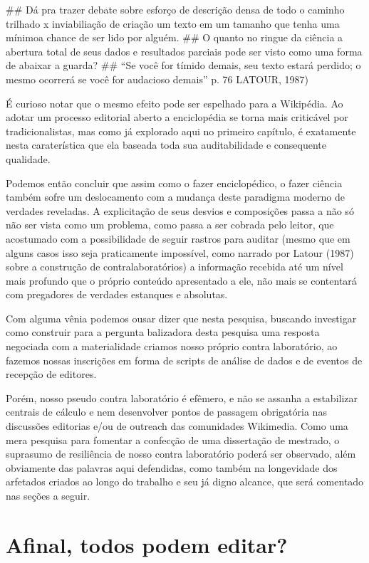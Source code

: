 ## Dá pra trazer debate sobre esforço de descrição densa de todo o caminho trilhado x inviabiliação de criação um texto em um tamanho que tenha uma mínimoa chance de ser lido por alguém. 
## O quanto no ringue da ciência a abertura total de seus dados e resultados parciais pode ser visto como uma forma de abaixar a guarda?
## ``Se você for tímido demais, seu texto estará perdido; o mesmo ocorrerá se você for audacioso demais'' p. 76 LATOUR, 1987)

É curioso notar que o mesmo efeito pode ser espelhado para a Wikipédia. Ao adotar um processo editorial aberto a enciclopédia se torna mais criticável por tradicionalistas, mas como já explorado aqui no primeiro capítulo, é exatamente nesta caraterística que ela baseada toda sua auditabilidade e consequente qualidade.

Podemos então concluir que assim como o fazer enciclopédico, o fazer ciência também sofre um deslocamento com a mudança deste paradigma moderno de verdades reveladas. A explicitação de seus desvios e composições passa a não só não ser vista como um problema, como passa a ser cobrada pelo leitor, que acostumado com a possibilidade de seguir rastros para auditar (mesmo que em alguns casos isso seja praticamente impossível, como narrado por Latour (1987) sobre a construção de contralaboratórios) a informação recebida até um nível mais profundo que o próprio conteúdo apresentado a ele, não mais se contentará com pregadores de verdades estanques e absolutas.

Com alguma vênia podemos ousar dizer que nesta pesquisa, buscando investigar como construir para a pergunta  balizadora desta pesquisa uma resposta negociada com a materialidade criamos nosso próprio contra laboratório, ao fazemos nossas inscrições em forma de scripts de análise de dados e de eventos de recepção de editores.

Porém, nosso pseudo contra laboratório é efêmero, e não se assanha a estabilizar centrais de cálculo e nem desenvolver pontos de passagem obrigatória nas discussões editorias e/ou de outreach das comunidades Wikimedia. Como uma mera pesquisa para fomentar a confecção de uma dissertação de mestrado, o suprasumo de resiliência de nosso contra laboratório poderá ser observado, além obviamente das palavras aqui defendidas, como também na longevidade dos arfetados criados ao longo do trabalho e seu já digno alcance, que será comentado nas seções a seguir.


\section{Afinal, todos podem editar?}

